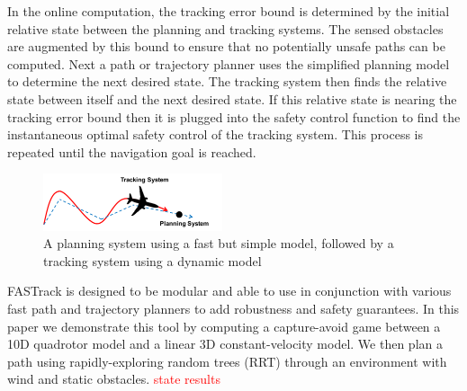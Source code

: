 In the online computation, the tracking error bound is determined by the initial relative state between the planning and tracking systems. The sensed obstacles are augmented by this bound to ensure that no potentially unsafe paths can be computed. Next a path or trajectory planner uses the simplified planning model to determine the next desired state. The tracking system then finds the relative state between itself and the next desired state. If this relative state is nearing the tracking error bound then it is plugged into the safety control function to find the instantaneous optimal safety control of the tracking system. This process is repeated until the navigation goal is reached. 
  

\begin{figure}
	\centering
	\includegraphics[width=0.47\textwidth]{fig/chasing}
	\caption{A planning system using a fast but simple model, followed by a tracking system using a dynamic model}
	\label{fig:chasing}
	\vspace{-.2in}
\end{figure}
%
FASTrack is designed to be modular and able to use in conjunction with various fast path and trajectory planners to add robustness and safety guarantees. In this paper we demonstrate this tool by computing a capture-avoid game between a 10D quadrotor model and a linear 3D constant-velocity model. We then plan a path using rapidly-exploring random trees (RRT) through an environment with wind and static obstacles. \textcolor{red}{state results}